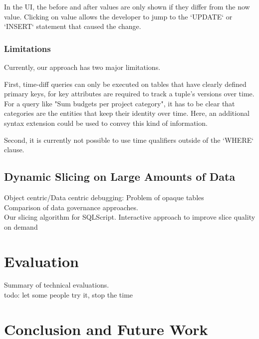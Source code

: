 \documentclass[english]{scrartcl}
\begin{document}
In the UI, the before and after values are only shown if they differ from the now value.
Clicking on value allows the developer to jump to the `UPDATE` or `INSERT` statement that caused the change.

\subsubsection{Limitations}

Currently, our approach has two major limitations.

First, time-diff queries can only be executed on tables that have clearly defined primary keys, for key attributes are required to track a tuple's versions over time.
For a query like "Sum budgets per project category", it has to be clear that categories are the entities that keep their identity over time.
Here, an additional syntax extension could be used to convey this kind of information.

Second, it is currently not possible to use time qualifiers outside of the `WHERE` clause.


\subsection{Dynamic Slicing on Large Amounts of Data}

Object centric/Data centric debugging: Problem of opaque tables\\
Comparison of data governance approaches.\\
Our slicing algorithm for SQLScript. Interactive approach to improve slice quality on demand\\

\section{Evaluation}

Summary of technical evaluations.\\
todo: let some people try it, stop the time

\section{Conclusion and Future Work}

\nocite{*}
\printbibliography[]
\end{document}
